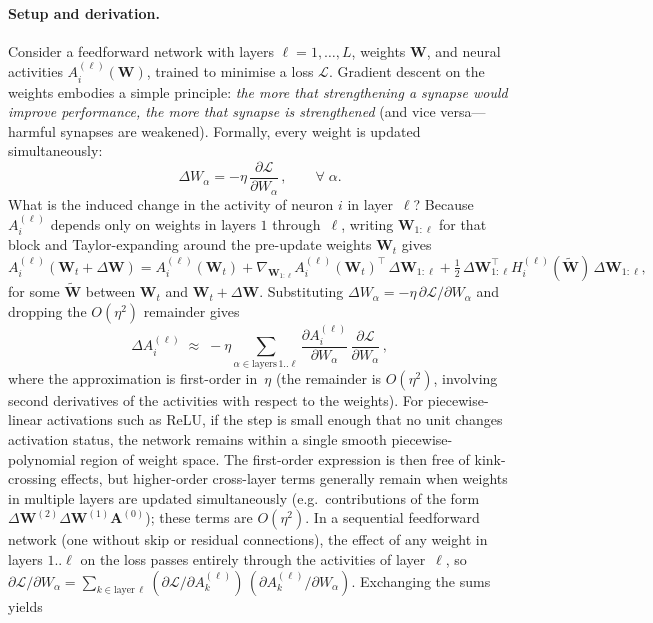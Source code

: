 \documentclass[10pt]{article}
\newcommand{\vW}{\mathbf{W}}
\newcommand{\vA}{\mathbf{A}}
\newcommand{\loss}{\mathcal{L}}
\begin{document}
\paragraph{Setup and derivation.}
Consider a feedforward network with layers $\ell=1,\ldots,L$, weights $\vW$, and neural activities $A_i^{(\ell)}(\vW)$, trained to minimise a loss $\loss$.  Gradient descent on the weights embodies a simple principle: \emph{the more that strengthening a synapse would improve performance, the more that synapse is strengthened} (and vice versa---harmful synapses are weakened).  Formally, every weight is updated simultaneously:
%
\begin{equation}
  \Delta W_\alpha = -\eta\,\frac{\partial \loss}{\partial W_\alpha}\,,
  \qquad \forall\;\alpha.
\end{equation}
%
What is the induced change in the activity of neuron $i$ in layer~$\ell$?  Because $A_i^{(\ell)}$ depends only on weights in layers $1$ through~$\ell$, writing $\vW_{1:\ell}$ for that block and Taylor-expanding around the pre-update weights $\vW_t$ gives
\[
  A_i^{(\ell)}(\vW_t + \Delta\vW)
  = A_i^{(\ell)}(\vW_t)
  + \nabla_{\!\vW_{1:\ell}} A_i^{(\ell)}(\vW_t)^{\!\top}\,\Delta\vW_{1:\ell}
  + \tfrac{1}{2}\,\Delta\vW_{1:\ell}^{\!\top} H_i^{(\ell)}(\widetilde{\vW})\,\Delta\vW_{1:\ell},
\]
for some $\widetilde{\vW}$ between $\vW_t$ and $\vW_t+\Delta\vW$.  Substituting $\Delta W_\alpha = -\eta\,\partial\loss/\partial W_\alpha$ and dropping the $O(\eta^2)$ remainder gives
%
\begin{equation}\label{eq:chain}
  \Delta A_i^{(\ell)}
  \;\approx\; -\eta \sum_{\alpha\in\text{layers}\,1..\ell} \frac{\partial A_i^{(\ell)}}{\partial W_\alpha}\,\frac{\partial \loss}{\partial W_\alpha}\,,
\end{equation}
%
where the approximation is first-order in~$\eta$ (the remainder is $O(\eta^2)$, involving second derivatives of the activities with respect to the weights).  For piecewise-linear activations such as ReLU, if the step is small enough that no unit changes activation status, the network remains within a single smooth piecewise-polynomial region of weight space.  The first-order expression is then free of kink-crossing effects, but higher-order cross-layer terms generally remain when weights in multiple layers are updated simultaneously (e.g.\ contributions of the form $\Delta\vW^{(2)}\Delta\vW^{(1)}\vA^{(0)}$); these terms are $O(\eta^2)$.
%
In a sequential feedforward network (one without skip or residual connections), the effect of any weight in layers $1..\ell$ on the loss passes entirely through the activities of layer~$\ell$, so $\partial \loss/\partial W_\alpha = \sum_{k\in\text{layer}\,\ell} (\partial \loss/\partial A_k^{(\ell)})\,(\partial A_k^{(\ell)}/\partial W_\alpha)$.  Exchanging the sums yields
\end{document}
